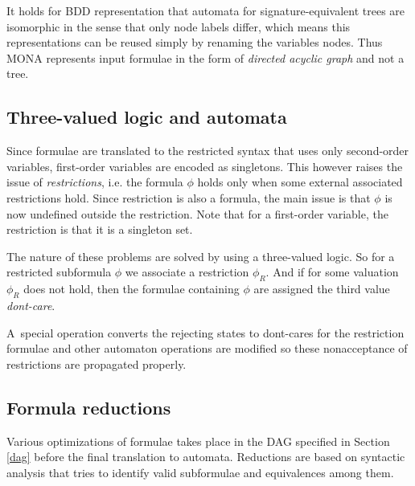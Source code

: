 It holds for BDD representation that automata for signature-equivalent trees are
isomorphic in the sense that only node labels differ, which means this
representations can be reused simply by renaming the variables nodes. Thus MONA
represents input formulae in the form of \emph{directed acyclic graph} and not a
tree.

\subsection{Three-valued logic and automata}
Since formulae are translated to the restricted syntax that uses only
second-order variables, first-order variables are encoded as singletons. This
however raises the issue of \emph{restrictions}, i.e. the formula $\phi$ holds
only when some external associated restrictions hold. Since restriction is also
a formula, the main issue is that $\phi$ is now undefined outside the
restriction. Note that for a first-order variable, the restriction is that it is
a singleton set.

The nature of these problems are solved by using a three-valued logic. So for a
restricted subformula $\phi$ we associate a restriction $\phi_R$. And if for
some valuation $\phi_R$ does not hold, then the formulae containing $\phi$ are
assigned the third value \emph{dont-care}.

A~special operation converts the rejecting states to dont-cares for the
restriction formulae and other automaton operations are modified so these
nonacceptance of restrictions are propagated properly.

\subsection{Formula reductions}
Various optimizations of formulae takes place in the DAG specified in Section
\ref{dag} before the final translation to automata. Reductions are based on
syntactic analysis that tries to identify valid subformulae and equivalences
among them.

